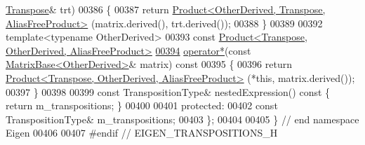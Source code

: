 \begin{DoxyCode}
      \hyperlink{group___core___module_class_eigen_1_1_transpose}{Transpose}& trt)
00386     \{
00387       \textcolor{keywordflow}{return} \hyperlink{group___core___module_class_eigen_1_1_product}{Product<OtherDerived, Transpose, AliasFreeProduct>}
      (matrix.derived(), trt.derived());
00388     \}
00389 
00392     \textcolor{keyword}{template}<\textcolor{keyword}{typename} OtherDerived>
00393     \textcolor{keyword}{const} \hyperlink{group___core___module_class_eigen_1_1_product}{Product<Transpose, OtherDerived, AliasFreeProduct>}
\hyperlink{class_eigen_1_1_transpose_3_01_transpositions_base_3_01_transpositions_derived_01_4_01_4_aa221d105a46384dde9c221bc0d6c7c43}{00394}     \hyperlink{class_eigen_1_1_transpose_3_01_transpositions_base_3_01_transpositions_derived_01_4_01_4_aa221d105a46384dde9c221bc0d6c7c43}{operator*}(\textcolor{keyword}{const} \hyperlink{group___core___module_class_eigen_1_1_matrix_base}{MatrixBase<OtherDerived>}& matrix)\textcolor{keyword}{ const}
00395 \textcolor{keyword}{    }\{
00396       \textcolor{keywordflow}{return} \hyperlink{group___core___module_class_eigen_1_1_product}{Product<Transpose, OtherDerived, AliasFreeProduct>}
      (*\textcolor{keyword}{this}, matrix.derived());
00397     \}
00398     
00399     \textcolor{keyword}{const} TranspositionType& nestedExpression()\textcolor{keyword}{ const }\{ \textcolor{keywordflow}{return} m\_transpositions; \}
00400 
00401   \textcolor{keyword}{protected}:
00402     \textcolor{keyword}{const} TranspositionType& m\_transpositions;
00403 \};
00404 
00405 \} \textcolor{comment}{// end namespace Eigen}
00406 
00407 \textcolor{preprocessor}{#endif // EIGEN\_TRANSPOSITIONS\_H}
\end{DoxyCode}

